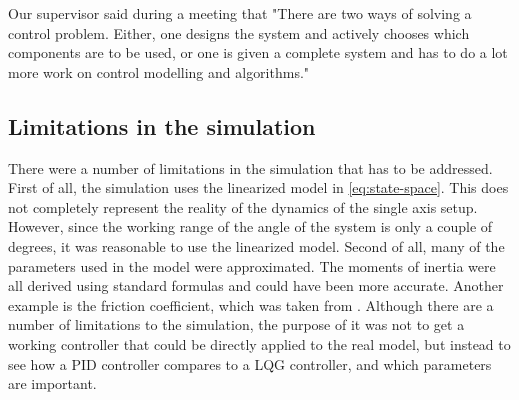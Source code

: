 Our supervisor said during a meeting that "There are two ways of solving a control problem. Either, one designs the system and actively chooses which components are to be used, or one is given a complete system and has to do a lot more work on control modelling and algorithms."

\subsection{Limitations in the simulation}
There were a number of limitations in the simulation that has to be addressed. First of all, the simulation uses the linearized model in \eqref{eq:state-space}. This does not completely represent the reality of the dynamics of the single axis setup. However, since the working range of the angle of the system is only a couple of degrees, it was reasonable to use the linearized model. Second of all, many of the parameters used in the model were approximated. The moments of inertia were all derived using standard formulas and could have been more accurate. Another example is the friction coefficient, which was taken from \cite{cubli-planar}. Although there are a number of limitations to the simulation, the purpose of it was not to get a working controller that could be directly applied to the real model, but instead to see how a PID controller compares to a LQG controller, and which parameters are important.

